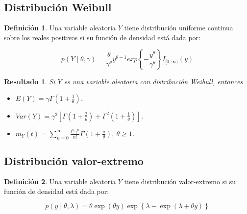 \documentclass[
  10pt,
  spanish,
]{book}
\providecommand{\tightlist}{%
  \setlength{\itemsep}{0pt}\setlength{\parskip}{0pt}}
\newtheorem{proposition}{Resultado}[chapter]
\theoremstyle{definition}
\newtheorem{definition}{Definición}[chapter]
\theoremstyle{definition}
\theoremstyle{definition}
\theoremstyle{definition}
\theoremstyle{remark}
\begin{document}
\hypertarget{distribuciuxf3n-weibull}{%
\subsection{Distribución Weibull}\label{distribuciuxf3n-weibull}}

\begin{definition}
\protect\hypertarget{def:unnamed-chunk-18}{}{\label{def:unnamed-chunk-18} }Una variable aleatoria \(Y\) tiene distribución uniforme continua sobre los reales positivos si su función de densidad está dada por:

\begin{equation}
p(Y\mid \theta, \gamma)=\frac{\theta}{\gamma^\theta}y^{\theta-1}exp\left\{-\frac{y^\theta}{\gamma^\theta}  \right\}I_{[0,\infty)}(y)
\end{equation}
\end{definition}

\begin{proposition}
\protect\hypertarget{prp:unnamed-chunk-19}{}{\label{prp:unnamed-chunk-19} }Si \(Y\) es una variable aleatoria con distribución Weibull, entonces

\begin{itemize}
\tightlist
\item
  \(E(Y)=\gamma \Gamma\left(1+\frac{1}{\theta}\right)\).
\item
  \(Var(Y)=\gamma^2 \left[ \Gamma\left(1+\frac{2}{\theta}\right) + \Gamma^2\left(1+\frac{1}{\theta}\right)\right]\).
\item
  \(m_Y(t)=\sum_{n=0}^\infty \frac{t^n\gamma^n}{n!}\Gamma\left(1+\frac{n}{\theta}\right), \ \theta\geq 1\).
\end{itemize}
\end{proposition}

\hypertarget{distribuciuxf3n-valor-extremo}{%
\subsection{Distribución valor-extremo}\label{distribuciuxf3n-valor-extremo}}

\begin{definition}
\protect\hypertarget{def:unnamed-chunk-20}{}{\label{def:unnamed-chunk-20} }Una variable aleatoria \(Y\) tiene distribución valor-extremo si su función de densidad está dada por:

\begin{equation}
p(y \mid \theta, \lambda )= \theta \exp(\theta y)\exp\left\{\lambda-\exp(\lambda+\theta y)\right\}
\end{equation}
\end{definition}
\end{document}
